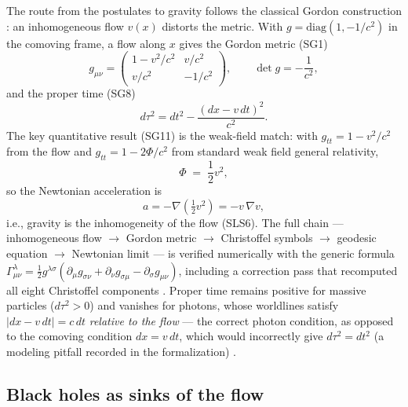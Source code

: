 \documentclass[aps,prd,preprint,superscriptaddress,amsmath,amssymb]{revtex4-2}
\begin{document}
The route from the postulates to gravity follows the classical Gordon
construction \cite{Gordon1923}: an inhomogeneous flow $v(x)$ distorts the
metric.  With $g=\mathrm{diag}(1,-1/c^2)$ in the comoving frame, a flow
along $x$ gives the Gordon metric (SG1)
\begin{equation}
g_{\mu\nu} = \begin{pmatrix} 1-v^2/c^2 & v/c^2 \\ v/c^2 & -1/c^2 \end{pmatrix},
\qquad \det g = -\frac{1}{c^2} ,
\end{equation}
and the proper time (SG8)
\begin{equation}
d\tau^2 = dt^2 - \frac{(dx-v\,dt)^2}{c^2} .
\end{equation}
The key quantitative result (SG11) is the weak-field match: with
$g_{tt}=1-v^2/c^2$ from the flow and $g_{tt}=1-2\Phi/c^2$ from standard weak
field general relativity,
\begin{equation}
\Phi \;=\; \frac12 v^2 ,
\end{equation}
so the Newtonian acceleration is
\begin{equation}
a = -\nabla\left(\tfrac12 v^2\right) = -v\,\nabla v ,
\end{equation}
i.e., gravity is the inhomogeneity of the flow (SLS6).  The full chain
--- inhomogeneous flow $\to$ Gordon metric $\to$ Christoffel symbols $\to$
geodesic equation $\to$ Newtonian limit --- is verified numerically with the
generic formula $\Gamma^\lambda_{\mu\nu}=\frac12 g^{\lambda\sigma}(\partial_\mu
g_{\sigma\nu}+\partial_\nu g_{\sigma\mu}-\partial_\sigma g_{\mu\nu})$,
including a correction pass that recomputed all eight Christoffel components
\cite{ProjectionPhysics-GR}.  Proper time remains positive for massive
particles ($d\tau^2>0$) and vanishes for photons, whose worldlines satisfy
$|dx-v\,dt|=c\,dt$ \emph{relative to the flow} --- the correct photon
condition, as opposed to the comoving condition $dx=v\,dt$, which would
incorrectly give $d\tau^2=dt^2$ (a modeling pitfall recorded in the
formalization) \cite{ProjectionPhysics-GR}.

\subsection{Black holes as sinks of the flow}
\end{document}
